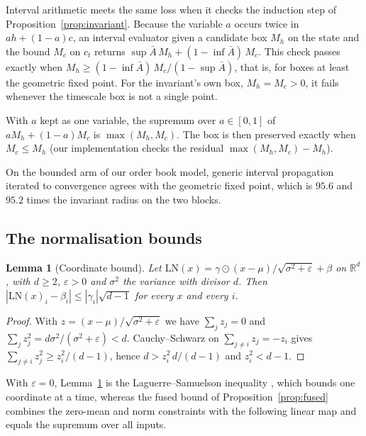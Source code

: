 \documentclass[11pt, a4paper]{article}
\newtheorem{lemma}[proposition]{Lemma}
\theoremstyle{remark}
\theoremstyle{plain}
\newcommand{\Abar}{\bar{A}}
\begin{document}
Interval arithmetic meets the same loss when it checks the induction step of
Proposition~\ref{prop:invariant}. Because the variable $a$ occurs twice in $a h + (1-a) c$, an
interval evaluator given a candidate box $M_h$ on the state and the bound $M_c$ on $c_t$ returns
$\sup\Abar\, M_h + (1 - \inf\Abar)\, M_c$. This check passes exactly when
$M_h \ge (1 - \inf\Abar)\, M_c / (1 - \sup\Abar)$, that is, for boxes at least the geometric
fixed point. For the invariant's own box, $M_h = M_c > 0$, it fails whenever the timescale box is
not a single point.

With $a$ kept as one variable, the supremum over $a \in [0,1]$ of $aM_h + (1-a)M_c$ is
$\max(M_h, M_c)$. The box is then preserved exactly when $M_c \le M_h$ (our implementation
checks the residual $\max(M_h, M_c) - M_h$).

On the bounded arm of our order book model, generic interval propagation iterated to convergence
agrees with the geometric fixed point, which is $95.6$ and $95.2$ times the invariant radius on
the two blocks.

\subsection{The normalisation bounds}

\begin{lemma}[Coordinate bound]
\label{lem:ln}
Let $\mathrm{LN}(x) = \gamma \odot (x - \mu)/\sqrt{\sigma^2 + \varepsilon} + \beta$ on
$\mathbb{R}^{d}$, with $d \ge 2$, $\varepsilon > 0$ and $\sigma^2$ the variance with divisor $d$.
Then $|\mathrm{LN}(x)_i - \beta_i| \le |\gamma_i|\sqrt{d - 1}$ for every $x$ and every $i$.
\end{lemma}

\begin{proof}
With $z = (x - \mu)/\sqrt{\sigma^2 + \varepsilon}$ we have $\sum_j z_j = 0$ and
$\sum_j z_j^2 = d\sigma^2/(\sigma^2 + \varepsilon) < d$. Cauchy--Schwarz on
$\sum_{j \ne i} z_j = -z_i$ gives $\sum_{j \ne i} z_j^2 \ge z_i^2/(d-1)$, hence
$d > z_i^2\, d/(d - 1)$ and $z_i^2 < d - 1$.
\end{proof}

With $\varepsilon = 0$, Lemma~\ref{lem:ln} is the Laguerre--Samuelson inequality
\citep{laguerre1880methode,samuelson1968deviant}, which bounds one coordinate at a time, whereas
the fused bound of Proposition~\ref{prop:fused} combines the zero-mean and norm constraints with
the following linear map and equals the supremum over all inputs.
\end{document}

